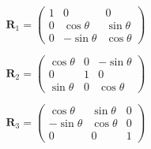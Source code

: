 {\begin{equation}
   \mathbf{R}_1 = \left(\begin{array}{ccc}
      1 & 0 & 0 \\
      0 & \cos{\theta} & \sin{\theta} \\
      0 & -\sin{\theta} & \cos{\theta}
   \end{array}\right)
\end{equation}

\begin{equation}
   \mathbf{R}_2 = \left(\begin{array}{ccc}
      \cos{\theta}  & 0 & -\sin{\theta} \\
      0 & 1 & 0 \\
      \sin{\theta} & 0 & \cos{\theta}
   \end{array} \right)
\end{equation}


\begin{equation}
   \mathbf{R}_3 = \left(\begin{array}{ccc}
       \cos{\theta} & \sin{\theta} & 0 \\
      -\sin{\theta} &  \cos{\theta} & 0 \\
      0 & 0 & 1
   \end{array}\right)
\end{equation}



}
